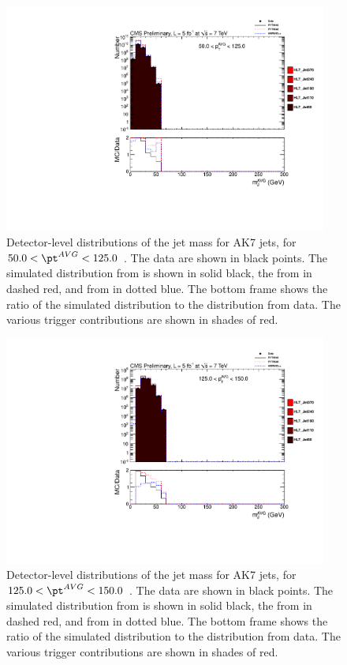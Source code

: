 


\begin{figure}[htbp]
\centering
\includegraphics[width=0.95\textwidth]{figs/histAK7MjetVsPtAvg_rawDataMCComparisons_stacktrigs_pt_1}
\caption{Detector-level distributions of the jet mass for AK7 jets,
for $50.0 < \pt^{AVG} < 125.0$ \GeVc. The data are shown in black points.
The simulated distribution from \PYTHIA is shown in solid black, 
the from \PYTHIAEIGHT in dashed red, and from \HERWIG in dotted blue. 
The bottom frame shows the ratio of the simulated distribution
to the distribution from data. The various trigger contributions are shown in shades of red.
\label{figs:histAK7MjetVsPtAvg_rawDataMCComparisons_stacktrigs_pt_1}}
\end{figure}



\begin{figure}[htbp]
\centering
\includegraphics[width=0.95\textwidth]{figs/histAK7MjetVsPtAvg_rawDataMCComparisons_stacktrigs_pt_2}
\caption{Detector-level distributions of the jet mass for AK7 jets,
for $125.0 < \pt^{AVG} < 150.0$ \GeVc. The data are shown in black points.
The simulated distribution from \PYTHIA is shown in solid black, 
the from \PYTHIAEIGHT in dashed red, and from \HERWIG in dotted blue. 
The bottom frame shows the ratio of the simulated distribution
to the distribution from data. The various trigger contributions are shown in shades of red.
\label{figs:histAK7MjetVsPtAvg_rawDataMCComparisons_stacktrigs_pt_2}}
\end{figure}



